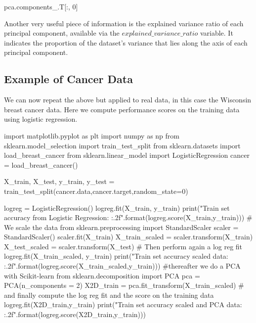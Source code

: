 \documentclass[%
oneside,                 %
final,                   %
10pt]{article}
\begin{document}
\bpycod
pca.components_.T[:, 0]

\epycod

Another very useful piece of information is the explained variance ratio of each principal component,
available via the $explained\_variance\_ratio$ variable. It indicates the proportion of the dataset’s
variance that lies along the axis of each principal component. 

\subsection{Example of Cancer Data}
We can now repeat the above but applied to real data, in this case the Wisconsin breast cancer data.
Here we compute performance scores on the training data using logistic regression.






























\bpycod
import matplotlib.pyplot as plt
import numpy as np
from sklearn.model_selection import  train_test_split 
from sklearn.datasets import load_breast_cancer
from sklearn.linear_model import LogisticRegression
cancer = load_breast_cancer()

X_train, X_test, y_train, y_test = train_test_split(cancer.data,cancer.target,random_state=0)

logreg = LogisticRegression()
logreg.fit(X_train, y_train)
print("Train set accuracy from Logistic Regression: {:.2f}".format(logreg.score(X_train,y_train)))
# We scale the data
from sklearn.preprocessing import StandardScaler
scaler = StandardScaler()
scaler.fit(X_train)
X_train_scaled = scaler.transform(X_train)
X_test_scaled = scaler.transform(X_test)
# Then perform again a log reg fit
logreg.fit(X_train_scaled, y_train)
print("Train set accuracy scaled data: {:.2f}".format(logreg.score(X_train_scaled,y_train)))
#thereafter we do a PCA with Scikit-learn
from sklearn.decomposition import PCA
pca = PCA(n_components = 2)
X2D_train = pca.fit_transform(X_train_scaled)
# and finally compute the log reg fit and the score on the training data	
logreg.fit(X2D_train,y_train)
print("Train set accuracy scaled and PCA data: {:.2f}".format(logreg.score(X2D_train,y_train)))
\end{document}
